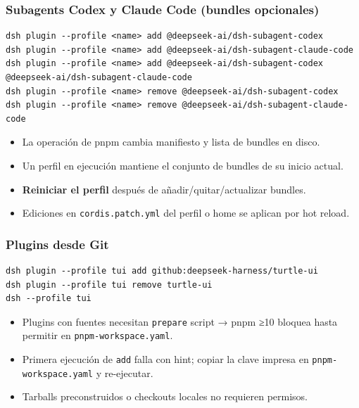 \documentclass[11pt,a4paper]{article}
\begin{document}
\subsubsection*{Subagents Codex y Claude Code (bundles opcionales)}


\begin{lstlisting}
dsh plugin --profile <name> add @deepseek-ai/dsh-subagent-codex
dsh plugin --profile <name> add @deepseek-ai/dsh-subagent-claude-code
dsh plugin --profile <name> add @deepseek-ai/dsh-subagent-codex @deepseek-ai/dsh-subagent-claude-code
dsh plugin --profile <name> remove @deepseek-ai/dsh-subagent-codex
dsh plugin --profile <name> remove @deepseek-ai/dsh-subagent-claude-code
\end{lstlisting}


\begin{itemize}[leftmargin=*,topsep=2pt,itemsep=1pt]
  \item La operación de pnpm cambia manifiesto y lista de bundles en disco.
  \item Un perfil en ejecución mantiene el conjunto de bundles de su inicio actual.
  \item \textbf{Reiniciar el perfil} después de añadir/quitar/actualizar bundles.
  \item Ediciones en \texttt{cordis.patch.yml} del perfil o home se aplican por hot reload.
\end{itemize}


\subsubsection*{Plugins desde Git}


\begin{lstlisting}
dsh plugin --profile tui add github:deepseek-harness/turtle-ui
dsh plugin --profile tui remove turtle-ui
dsh --profile tui
\end{lstlisting}


\begin{itemize}[leftmargin=*,topsep=2pt,itemsep=1pt]
  \item Plugins con fuentes necesitan \texttt{prepare} script → pnpm ≥10 bloquea hasta permitir en \texttt{pnpm-workspace.yaml}.
  \item Primera ejecución de \texttt{add} falla con hint; copiar la clave impresa en \texttt{pnpm-workspace.yaml} y re-ejecutar.
  \item Tarballs preconstruidos o checkouts locales no requieren permisos.
\end{itemize}
\end{document}
